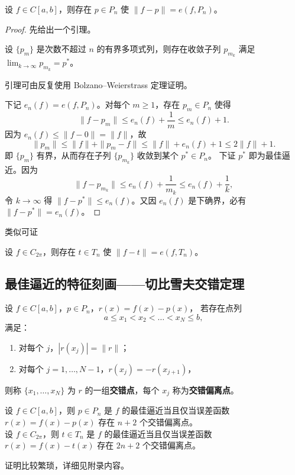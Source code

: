 \begin{theorem}
设 $f\in C[a,b]$，则存在 $p\in P_n$ 使 $\|f-p\| = e(f,P_n)$。
\end{theorem}
\begin{proof}
先给出一个引理。
\begin{lemma}
设 $\{p_m\}$ 是次数不超过 $n$ 的有界多项式列，则存在收敛子列 $p_{m_k}$ 满足 $\lim_{k\to\infty} p_{m_k} = p^*$。
\end{lemma}
引理可由反复使用 Bolzano–Weierstrass 定理证明。

下记 $e_n(f)=e(f,P_n)$。对每个 $m\ge1$，存在 $p_m\in P_n$ 使得
\[
\|f-p_m\|  \leqslant  e_n(f) + \frac1m  \leqslant  e_n(f)+1.
\]
因为 $e_n(f) \leqslant  \|f-0\| = \|f\|$，故
\[
\|p_m\|  \leqslant  \|f\| + \|p_m-f\|  \leqslant \|f\| + e_n(f)+1  \leqslant 2\|f\|+1.
\]
即 $\{p_m\}$ 有界，从而存在子列 $\{p_{m_k}\}$ 收敛到某个 $p^*\in P_n$。
下证 $p^*$ 即为最佳逼近。因为
\[
\|f-p_{m_k}\|  \leqslant e_n(f) + \frac1{m_k}  \leqslant e_n(f) + \frac1k,
\]
令 $k\to\infty$ 得 $\|f-p^*\| \leqslant e_n(f)$。又因 $e_n(f)$ 是下确界，必有 $\|f-p^*\| = e_n(f)$。
\end{proof}

类似可证
\begin{theorem}
设 $f\in C_{2\pi}$，则存在 $t\in T_n$ 使 $\|f-t\| = e(f,T_n)$。
\end{theorem}

\subsection{最佳逼近的特征刻画——切比雪夫交错定理}
\begin{definition}[交错偏离点]
设 $f\in C[a,b]$，$p\in P_n$，$r(x)=f(x)-p(x)$，
若存在点列
\[
a \leqslant  x_1 < x_2 < \dots < x_N  \leqslant  b,
\]
满足：
\begin{enumerate}
    \item 对每个 $j$，$|r(x_j)| = \|r\| $；
    \item 对每个 $j=1,\dots,N-1$，$r(x_j) = -r(x_{j+1})$，
\end{enumerate}
则称 $\{x_1,\dots,x_N\}$ 为 $r$ 的一组\textbf{交错点}，每个 $x_j$ 称为\textbf{交错偏离点}。
\end{definition}

\begin{theorem}[切比雪夫最佳逼近定理]
设 $f\in C[a,b]$，则 $p\in P_n$ 是 $f$ 的最佳逼近当且仅当误差函数 $r(x)=f(x)-p(x)$ 存在 $n+2$ 个交错偏离点。\\
设 $f\in C_{2\pi}$，则 $t\in T_n$ 是 $f$ 的最佳逼近当且仅当误差函数 $r(x)=f(x)-t(x)$ 存在 $2n+2$ 个交错偏离点。
\end{theorem}
% 
证明比较繁琐，详细见附录内容。
